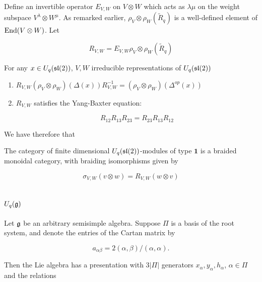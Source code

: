Define an invertible operator $E_{V,W}$ on $V \otimes W$ which acts as
$\lambda\mu$ on the weight subspace $V^\lambda \otimes W^\mu$. As remarked
earlier, $\rho_V \otimes \rho_W (\tilde{R}_q) $ is a well-defined element of
$\operatorname{End}(V \otimes W)$. Let 

\begin{equation}
R_{V,W} = E_{V,W} \rho_V \otimes \rho_W (\tilde{R}_q)
\end{equation}

\begin{claim}
For any $x \in U_q(\mathfrak{sl}(2))$, $V,W$ irreducible representations of $U_q(\mathfrak{sl}(2))$
\begin{enumerate}
\item $R_{V,W} (\rho_V \otimes \rho_W) (\Delta(x)) R^{-1}_{V,W} = (\rho_{V} \otimes \rho_W)(\Delta^{op}(x))$
\item $R_{V,W}$  satisfies the Yang-Baxter equation: 

\begin{equation}
R_{12} R_{13} R_{23} = R_{23} R_{13} R_{12}
\end{equation}
\end{enumerate}
\end{claim}

We have therefore that 

\begin{theorem}
The category of finite dimensional $U_q(\mathfrak{sl}(2))$-modules of type $\mathbf{1}$ is a braided monoidal category, with braiding isomorphisms given by 

\begin{equation}
\sigma_{V,W}(v \otimes w) = R_{V,W}(w \otimes v)
\end{equation}
\end{theorem}


\section{$U_q(\mathfrak{g})$}
\label{U_q(g)}


    Let $\mathfrak{g}$ be an arbitrary semisimple algebra. Suppose $\Pi$ is
    a basis of the root system, and denote the entries of the Cartan matrix
    by 

    \begin{equation}
        a_{\alpha\beta} = 2(\alpha, \beta) / (\alpha, \alpha).
    \end{equation}

    Then the Lie algebra has a presentation with $3|\Pi|$ generators
    $x_\alpha, y_\alpha, h_\alpha$, $\alpha \in \Pi$ and the relations 

